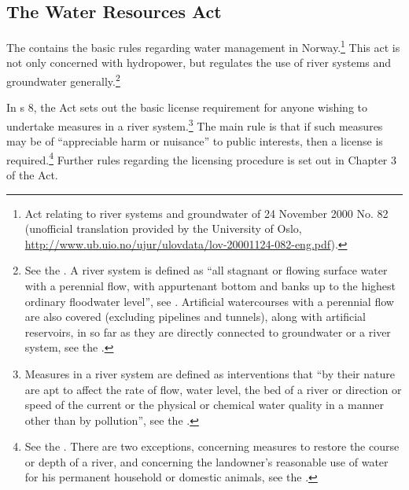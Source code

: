 
\subsection{The Water Resources Act}\label{sec:wra00}

The \cite{wra00} contains the basic rules regarding water management in Norway.\footnote{Act relating to river systems and groundwater of 24 November 2000 No. 82 (unofficial translation provided by the University of Oslo, \url{http://www.ub.uio.no/ujur/ulovdata/lov-20001124-082-eng.pdf}).} This act is not only concerned with hydropower, but regulates the use of river systems and groundwater generally.\footnote{See the \cite[1]{wra00}. A river system is defined as ``all stagnant or flowing surface water with a perennial flow, with appurtenant bottom and banks up to the highest ordinary floodwater level'', see \cite[2]{wra00}. Artificial watercourses with a perennial flow are also covered (excluding pipelines and tunnels), along with artificial reservoirs, in so far as they are directly connected to groundwater or a river system, see the \cite[2a-2b]{wra00}.} 

In s 8, the Act sets out the basic license requirement for anyone wishing to undertake measures in a river system.\footnote{Measures in a river system are defined as interventions that ``by their nature are apt to affect the rate of flow, water level, the bed of a river or direction or speed of the current or the physical or chemical water quality in a manner other than by pollution'', see the \cite[3a]{wra00}.} The main rule is that if such measures may be of ``appreciable harm or nuisance''  to public interests, then a license is required.\footnote{See the \cite[8]{wra00}. There are two exceptions, concerning measures to restore the course or depth of a river, and concerning the landowner's reasonable use of water for his permanent household or domestic animals, see the \cite[12|15]{wra00}.} Further rules regarding the licensing procedure is set out in Chapter 3 of the Act.

